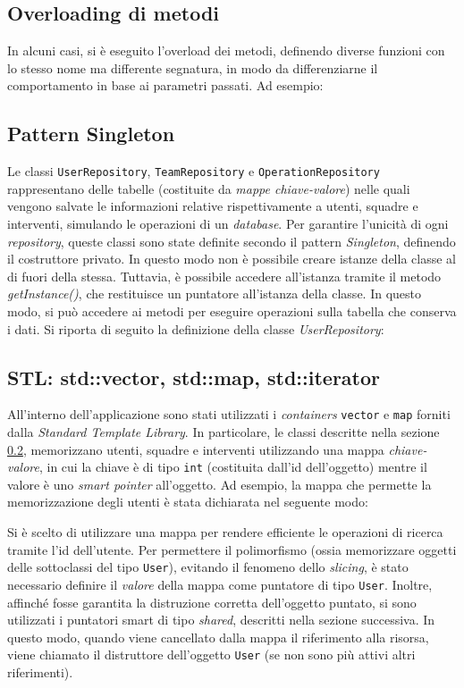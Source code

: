 \subsection{Overloading di metodi}
In alcuni casi, si è eseguito l'overload dei metodi, definendo diverse funzioni con lo stesso nome ma differente segnatura, in modo da differenziarne il comportamento in base ai parametri passati. Ad esempio:


\subsection{Pattern Singleton}\label{sec:singleton}
Le classi \texttt{UserRepository}, \texttt{TeamRepository} e \texttt{OperationRepository} rappresentano delle tabelle (costituite da \textit{mappe chiave-valore}) nelle quali vengono salvate le informazioni relative rispettivamente a utenti, squadre e interventi, simulando le operazioni di un \textit{database}. Per garantire l'unicità di ogni \textit{repository}, queste classi sono state definite secondo il pattern \textit{Singleton}, definendo il costruttore privato. In questo modo non è possibile creare istanze della classe al di fuori della stessa. Tuttavia, è possibile accedere all'istanza tramite il metodo \textit{getInstance()}, che restituisce un puntatore all'istanza della classe. In questo modo, si può accedere ai metodi per eseguire operazioni sulla tabella che conserva i dati. Si riporta di seguito la definizione della classe \textit{UserRepository}:


\subsection{STL: std::vector, std::map, std::iterator}
All'interno dell'applicazione sono stati utilizzati i \textit{containers} \texttt{vector} e \texttt{map} forniti dalla \textit{Standard Template Library}. In particolare, le classi descritte nella sezione \ref{sec:singleton}, memorizzano utenti, squadre e interventi utilizzando una mappa \textit{chiave-valore}, in cui la chiave è di tipo \texttt{int} (costituita dall'id dell'oggetto) mentre il valore è uno \textit{smart pointer} all'oggetto. Ad esempio, la mappa che permette la memorizzazione degli utenti è stata dichiarata nel seguente modo:

Si è scelto di utilizzare una mappa per rendere efficiente le operazioni di ricerca tramite l'id dell'utente. Per permettere il polimorfismo (ossia memorizzare oggetti delle sottoclassi del tipo \texttt{User}), evitando il fenomeno dello \textit{slicing}, è stato necessario definire il \textit{valore} della mappa come puntatore di tipo \texttt{User}. Inoltre, affinché fosse garantita la distruzione corretta dell'oggetto puntato, si sono utilizzati i puntatori smart di tipo \textit{shared}, descritti nella sezione successiva. In questo modo, quando viene cancellato dalla mappa il riferimento alla risorsa, viene chiamato il distruttore dell'oggetto \texttt{User} (se non sono più attivi altri riferimenti).

